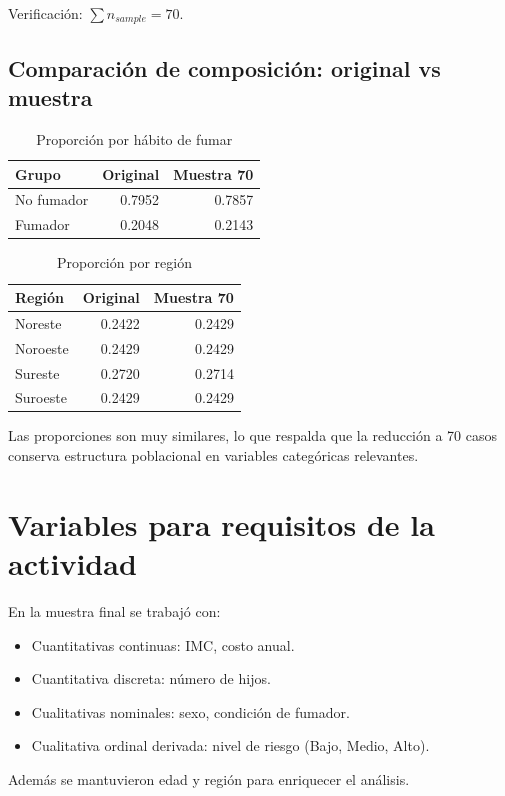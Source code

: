 \documentclass[12pt,a4paper]{article}
\begin{document}
\noindent Verificación: \(\sum n_{sample}=70\).

\subsection{Comparación de composición: original vs muestra}
\begin{table}[H]
\centering
\caption{Proporción por hábito de fumar}
\begin{tabular}{lrr}
\toprule
\textbf{Grupo} & \textbf{Original} & \textbf{Muestra 70} \\
\midrule
No fumador & 0.7952 & 0.7857 \\
Fumador    & 0.2048 & 0.2143 \\
\bottomrule
\end{tabular}
\end{table}

\begin{table}[H]
\centering
\caption{Proporción por región}
\begin{tabular}{lrr}
\toprule
\textbf{Región} & \textbf{Original} & \textbf{Muestra 70} \\
\midrule
Noreste & 0.2422 & 0.2429 \\
Noroeste & 0.2429 & 0.2429 \\
Sureste & 0.2720 & 0.2714 \\
Suroeste & 0.2429 & 0.2429 \\
\bottomrule
\end{tabular}
\end{table}

Las proporciones son muy similares, lo que respalda que la reducción a 70 casos conserva estructura poblacional en variables categóricas relevantes.

\section{Variables para requisitos de la actividad}
En la muestra final se trabajó con:
\begin{itemize}
    \item Cuantitativas continuas: IMC, costo anual.
    \item Cuantitativa discreta: número de hijos.
    \item Cualitativas nominales: sexo, condición de fumador.
    \item Cualitativa ordinal derivada: nivel de riesgo (Bajo, Medio, Alto).
\end{itemize}
Además se mantuvieron edad y región para enriquecer el análisis.
\end{document}
